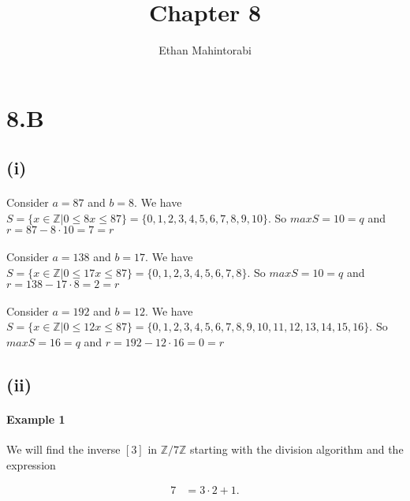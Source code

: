 \documentclass{article}
\begin{document}
  
  \title{Chapter 8}
  \author{Ethan Mahintorabi}
  
  \maketitle

  \section*{8.B}
    \subsection*{(i)}
      \paragraph{} Consider $a = 87$ and $b = 8$. We have $S = \{ x \in \mathbb{Z} | 0 \leq 8x \leq 87\} = \{0,1,2,3,4,5,6,7,8,9,10\}$. So $maxS = 10 =q$ and $r = 87 -  8 \cdot 10 = 7 = r $

      \paragraph{} Consider $a = 138$ and $b = 17$. We have $S = \{ x \in \mathbb{Z} | 0 \leq 17x \leq 87\} = \{0,1,2,3,4,5,6,7,8\}$. So $maxS = 10 =q$ and $r = 138 -  17 \cdot 8 = 2 = r $


      \paragraph{} Consider $a = 192$ and $b = 12$. We have $S = \{ x \in \mathbb{Z} | 0 \leq 12x \leq 87\} = \{0,1,2,3,4,5,6,7,8,9,10,11,12,13,14,15,16\}$. So $maxS = 16 =q$ and $r = 192 -  12 \cdot 16 = 0 = r $

    \subsection*{(ii)}
      \paragraph{Example 1}We will find the inverse $[3]$ in $\mathbb{Z}/7\mathbb{Z}$ starting with the division algorithm and the expression

      \[
        \begin{split}
          7 &= 3 \cdot 2 + 1.\\
        \end{split}
      \]
      
\end{document}
